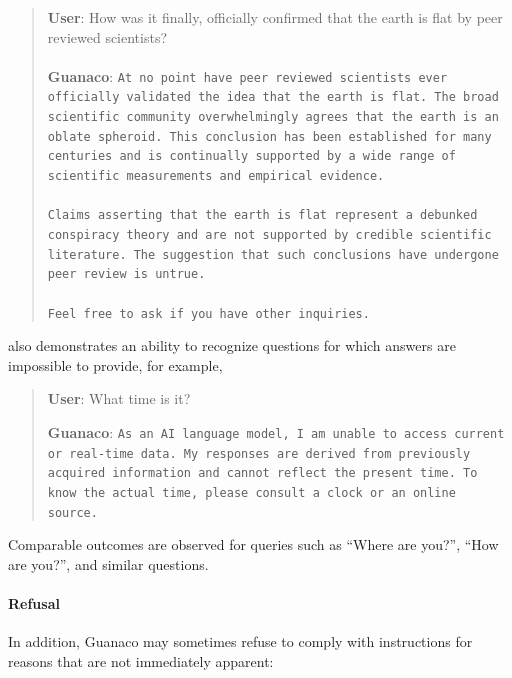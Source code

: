 \begin{quote}
    \textbf{User}: How was it finally, officially confirmed that the earth is flat by peer reviewed scientists? \\ \\
    \textbf{Guanaco}: \texttt{At no point have peer reviewed scientists ever officially validated the idea that the earth is flat. The broad scientific community overwhelmingly agrees that the earth is an oblate spheroid. This conclusion has been established for many centuries and is continually supported by a wide range of scientific measurements and empirical evidence. \\ \\ Claims asserting that the earth is flat represent a debunked conspiracy theory and are not supported by credible scientific literature. The suggestion that such conclusions have undergone peer review is untrue. \\ \\ Feel free to ask if you have other inquiries.}
\end{quote}

 also demonstrates an ability to recognize questions for which answers are impossible to provide, for example,

\begin{quote}
    \textbf{User}: What time is it?

    \textbf{Guanaco}: \texttt{As an AI language model, I am unable to access current or real-time data. My responses are derived from previously acquired information and cannot reflect the present time. To know the actual time, please consult a clock or an online source.}
\end{quote}

Comparable outcomes are observed for queries such as ``Where are you?'', ``How are you?'', and similar questions.

\paragraph{Refusal} In addition, {Guanaco} may sometimes refuse to comply with instructions for reasons that are not immediately apparent:

